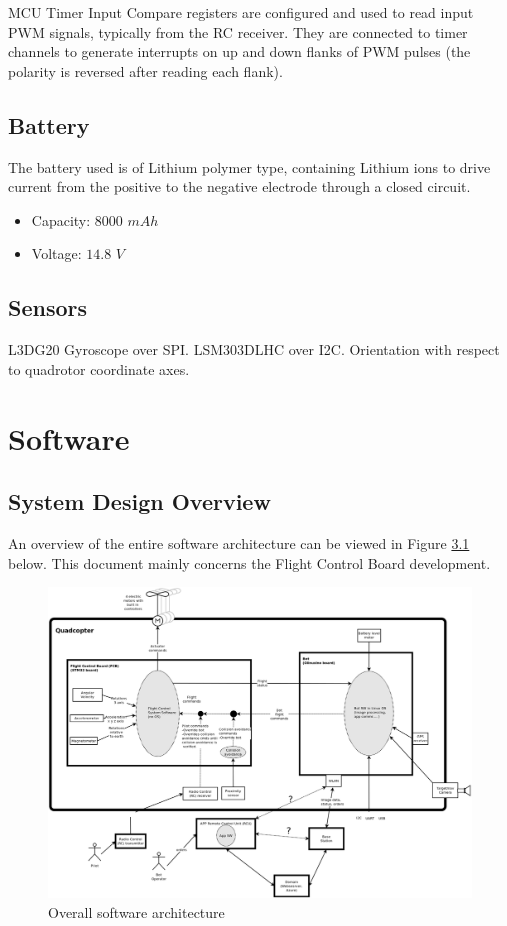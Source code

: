 \documentclass[a4paper]{report}
\begin{document}
MCU Timer Input Compare registers are configured and used to read input PWM signals, typically from the RC receiver. They are connected to timer channels to generate interrupts on up and down flanks of PWM pulses (the polarity is reversed after reading each flank).

	\section{Battery}

The battery used is of Lithium polymer type, containing Lithium ions to drive current from the positive to the negative electrode through a closed circuit.

\begin{itemize}
  \item Capacity: $8000$ $mAh$
  \item Voltage: $14.8$ $V$
\end{itemize}

	\section{Sensors}

L3DG20 Gyroscope over SPI. LSM303DLHC over I2C. Orientation with respect to quadrotor coordinate axes.

\chapter{Software}

	\section{System Design Overview}
An overview of the entire software architecture can be viewed in Figure \ref{fig:high-level-sw-arch} below. This document mainly concerns the Flight Control Board development.

\begin{figure}[h]
    \centering
    \includegraphics[scale=0.42]{images/high-level-sw-design.png}
    \caption{Overall software architecture}
    \label{fig:high-level-sw-arch}
\end{figure}
\end{document}
